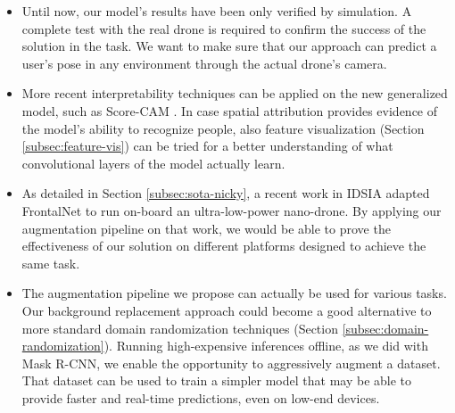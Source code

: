 \begin{itemize}

    \item Until now, our model's results have been only verified by simulation. A complete test with the real drone is required to confirm the success of the solution in the task. We want to make sure that our approach can predict a user's pose in any environment through the actual drone's camera.
    
    \item More recent interpretability techniques can be applied on the new generalized model, such as Score-CAM \cite{wang2020scorecam}. In case spatial attribution provides evidence of the model's ability to recognize people, also feature visualization (Section \ref{subsec:feature-vis}) can be tried for a better understanding of what convolutional layers of the model actually learn.
    
    \item As detailed in Section \ref{subsec:sota-nicky}, a recent work in IDSIA \cite{zimmerman2020thesis} adapted FrontalNet to run on-board an ultra-low-power nano-drone. By applying our augmentation pipeline on that work, we would be able to prove the effectiveness of our solution on different platforms designed to achieve the same task.
    
    \item The augmentation pipeline we propose can actually be used for various tasks. Our background replacement approach could become a good alternative to more standard domain randomization techniques (Section \ref{subsec:domain-randomization}). Running high-expensive inferences offline, as we did with Mask R-CNN, we enable the opportunity to aggressively augment a dataset. That dataset can be used to train a simpler model that may be able to provide faster and real-time predictions, even on low-end devices.
    
\end{itemize}
